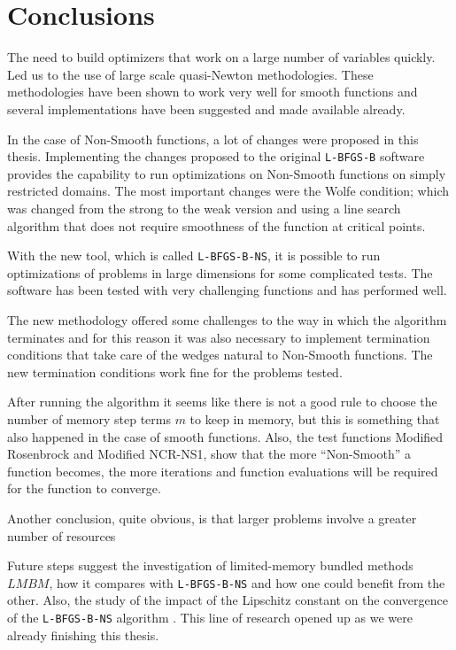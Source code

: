 \chapter{Conclusions}
The need to build optimizers that work on a large number of variables quickly. Led us to the use of large scale quasi-Newton methodologies. These methodologies have been shown to work very well for smooth functions and several implementations have been suggested and made available already.

In the case of Non-Smooth functions, a lot of changes were proposed in this thesis. Implementing the changes proposed to the original \texttt{L-BFGS-B} software provides the capability to run optimizations on Non-Smooth functions on simply restricted domains. The most important changes were the Wolfe condition; which was changed from the strong to the weak version and using a line search algorithm that does not require smoothness of the function at critical points.

With the new tool, which is called \texttt{L-BFGS-B-NS}, it is possible to run optimizations of problems in large dimensions for some complicated tests. The software has been tested with very challenging functions and has performed well.

The new methodology offered some challenges to the way in which the algorithm terminates and for this reason it was also necessary to implement termination conditions that take care of the wedges natural to Non-Smooth functions. The new termination conditions work fine for the problems tested.

After running the algorithm it seems like there is not a good rule to choose the number of memory step terms $m$ to keep in memory, but this is something that also happened in the case of smooth functions. Also, the test functions Modified Rosenbrock and Modified NCR-NS1, show that the more ``Non-Smooth'' a function becomes, the more iterations and function evaluations will be required for the function to converge.

Another conclusion, quite obvious, is that larger problems involve a greater number of resources

Future steps suggest the investigation of limited-memory bundled methods $LMBM$, how it compares with \texttt{L-BFGS-B-NS} and how one could benefit from the other. Also, the study of the impact of the Lipschitz constant on the convergence of the \texttt{L-BFGS-B-NS} algorithm \citep{QJ:QJ935}. This line of research opened up as we were already finishing this thesis.

